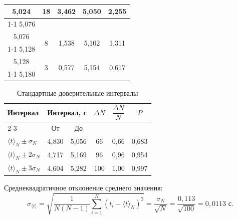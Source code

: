 \documentclass[a4paper,12pt]{article}
\begin{document}
\begin{table}[H]
\begin{tabular}{|c|c|c|c|c|}
        5{,}024 & \multirow{2}{*}{18}
        & \multirow{2}{*}{3{,}462}
        & \multirow{2}{*}{5{,}050}
        & \multirow{2}{*}{2{,}255} \\ \cline{1-1}
        5{,}076 & & & & \\ \hline

        5{,}076 & \multirow{2}{*}{8}
        & \multirow{2}{*}{1{,}538}
        & \multirow{2}{*}{5{,}102}
        & \multirow{2}{*}{1{,}311} \\ \cline{1-1}
        5{,}128 & & & & \\ \hline

        5{,}128 & \multirow{2}{*}{3}
        & \multirow{2}{*}{0{,}577}
        & \multirow{2}{*}{5{,}154}
        & \multirow{2}{*}{0{,}617} \\ \cline{1-1}
        5{,}180 & & & & \\ \hline

    \end{tabular}
\end{table}

\begin{table}[H]
    \centering
    \caption{Стандартные доверительные интервалы}
    \label{tab:standart-intervals}
    \begin{tabular}{|l|c|c|c|c|c|}
        \hline
        \multirow{2}{*}{Интервал} & \multicolumn{2}{c|}{Интервал, с}
        & \multirow{2}{*}{$\Delta N$}
        & \multirow{2}{*}{$\dfrac{\Delta N}{N}$}
        & \multirow{2}{*}{$P$} \\
        \cline{2-3}
        & От & До & & & \\
        \hline
        $\langle t\rangle_N \pm \sigma_N$
        & 4{,}830 & 5{,}056 & 66 & 0{,}66 & 0{,}683\\
        \hline
        $\langle t\rangle_N \pm 2\sigma_N$
        & 4{,}717 & 5{,}169 & 96 & 0{,}96 & 0{,}954\\
        \hline
        $\langle t\rangle_N \pm 3\sigma_N$
        & 4{,}604 & 5{,}282 & 100 & 1{,}00 & 0{,}997\\
        \hline
    \end{tabular}
\end{table}

Среднеквадратичное отклонение среднего значения:
\begin{equation}
\sigma_{\langle t\rangle} = \sqrt{\frac{1}{N(N-1)} \sum_{i=1}^{N} (t_i - \langle t\rangle_N)^2} = \frac{\sigma_N}{\sqrt{N}} = \frac{0{,}113}{\sqrt{100}} = 0{,}0113\text{ с}.
\end{equation}
\end{document}
